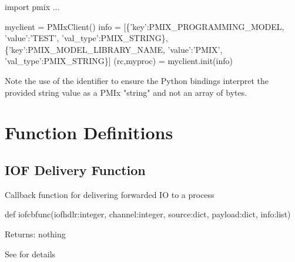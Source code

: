 \begin{codepar}

import pmix
...

myclient = PMIxClient()
info = [\{'key':PMIX_PROGRAMMING_MODEL,
          'value':'TEST', 'val_type':PMIX_STRING\},
        \{'key':PMIX_MODEL_LIBRARY_NAME,
          'value':'PMIX', 'val_type':PMIX_STRING\}]
(rc,myproc) = myclient.init(info)

\end{codepar}

Note the use of the  identifier to ensure the Python bindings interpret the provided string value as a \ac{PMIx} "string" and not an array of bytes.

\section{Function Definitions}
\label{app:python:fns}

\subsection{IOF Delivery Function}

\summary

Callback function for delivering forwarded \ac{IO} to a process

\format

\pyspecificstart
\begin{codepar}
def iofcbfunc(iofhdlr:integer, channel:integer,
              source:dict, payload:dict, info:list)
\end{codepar}
\pyspecificend

\begin{arglist}
\end{arglist}

Returns: nothing

See  for details



